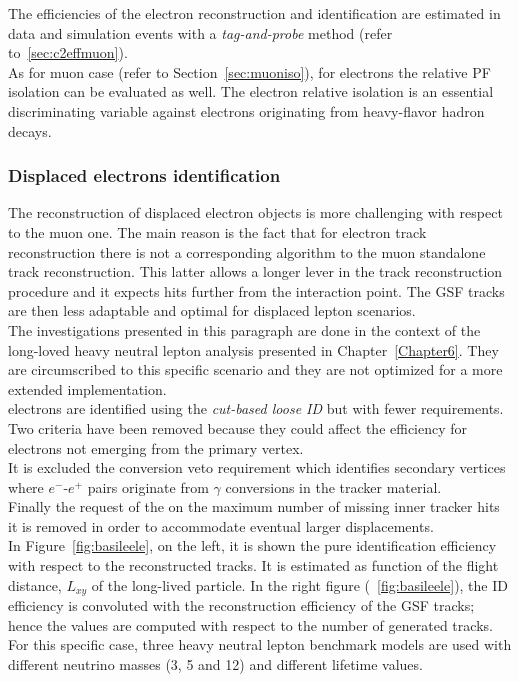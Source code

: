 The efficiencies of the electron reconstruction and identification are
estimated in data and simulation events with a \emph{tag-and-probe}
method (refer to~\ref{sec:c2effmuon}).\\

As for muon case (refer to Section~\ref{sec:muoniso}), for electrons
the relative PF isolation can be evaluated as well. The electron
relative isolation is an essential discriminating variable against 
electrons originating from heavy-flavor hadron decays.


\subsubsection{Displaced electrons identification}\label{sec:c2dispele}

The reconstruction of displaced electron objects is more challenging
with respect to the muon one. 
The main reason is the fact that for electron track reconstruction
there is not a corresponding algorithm to the muon standalone track
reconstruction. This latter allows a longer lever in the track
reconstruction procedure and it expects hits
further from the interaction point. The GSF tracks are then less
adaptable and optimal for displaced lepton scenarios.\\

The investigations presented in this paragraph are done in the context
of the long-loved heavy neutral lepton analysis presented in
Chapter~\ref{Chapter6}. They are circumscribed
to this specific scenario and they are not optimized for a more extended
implementation.  \\


\Displ electrons are identified using the \emph{cut-based loose ID}
but with fewer requirements. Two criteria have been removed because
they could affect the efficiency for electrons
not emerging from the primary vertex. \\
It is excluded the conversion veto requirement which identifies
secondary vertices where $e^{-}$-$e^{+}$ pairs 
originate from $\gamma$ conversions in the tracker material.\\
Finally the request of the on the maximum number of
missing inner tracker hits it is removed in order to accommodate 
eventual larger displacements. \\
In Figure~\ref{fig:basileele}, on the left, it is shown the pure
identification efficiency with respect to the
reconstructed tracks. It is estimated as function of the flight
distance, $L_{xy}$ of the long-lived particle. In the right figure
(~\ref{fig:basileele}), the ID efficiency is convoluted with the
reconstruction efficiency of the GSF tracks; hence the values are
computed with respect to the number of
generated tracks. For this specific case, three heavy neutral lepton
benchmark models are used with different neutrino masses (3, 5 and
12\GeV) and different lifetime values.

